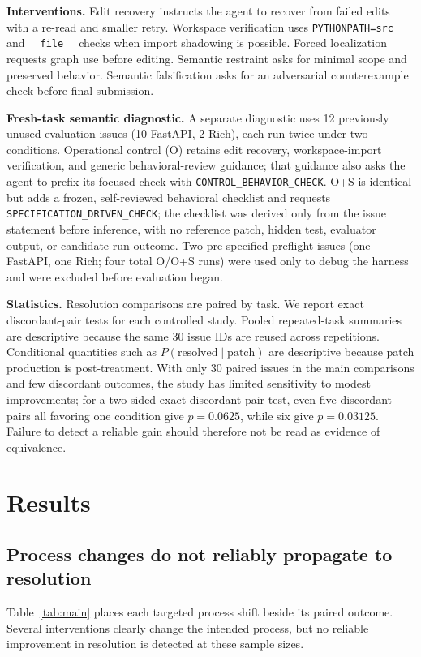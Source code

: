 \documentclass[10pt,twocolumn]{article}
\begin{document}
\textbf{Interventions.} Edit recovery instructs the agent to recover from failed edits with a re-read and smaller retry. Workspace verification uses \texttt{PYTHONPATH=src} and \texttt{\_\_file\_\_} checks when import shadowing is possible. Forced localization requests graph use before editing. Semantic restraint asks for minimal scope and preserved behavior. Semantic falsification asks for an adversarial counterexample check before final submission.

\textbf{Fresh-task semantic diagnostic.} A separate diagnostic uses 12 previously unused evaluation issues (10 FastAPI, 2 Rich), each run twice under two conditions. Operational control (O) retains edit recovery, workspace-import verification, and generic behavioral-review guidance; that guidance also asks the agent to prefix its focused check with \texttt{CONTROL\_BEHAVIOR\_CHECK}. O+S is identical but adds a frozen, self-reviewed behavioral checklist and requests \texttt{SPECIFICATION\_DRIVEN\_CHECK}; the checklist was derived only from the issue statement before inference, with no reference patch, hidden test, evaluator output, or candidate-run outcome. Two pre-specified preflight issues (one FastAPI, one Rich; four total O/O+S runs) were used only to debug the harness and were excluded before evaluation began.

\textbf{Statistics.} Resolution comparisons are paired by task. We report exact discordant-pair tests for each controlled study. Pooled repeated-task summaries are descriptive because the same 30 issue IDs are reused across repetitions. Conditional quantities such as $P(\mathrm{resolved}\mid\mathrm{patch})$ are descriptive because patch production is post-treatment. With only 30 paired issues in the main comparisons and few discordant outcomes, the study has limited sensitivity to modest improvements; for a two-sided exact discordant-pair test, even five discordant pairs all favoring one condition give $p=0.0625$, while six give $p=0.03125$. Failure to detect a reliable gain should therefore not be read as evidence of equivalence.

\section{Results}
\subsection{Process changes do not reliably propagate to resolution}
Table~\ref{tab:main} places each targeted process shift beside its paired outcome. Several interventions clearly change the intended process, but no reliable improvement in resolution is detected at these sample sizes.
\end{document}
